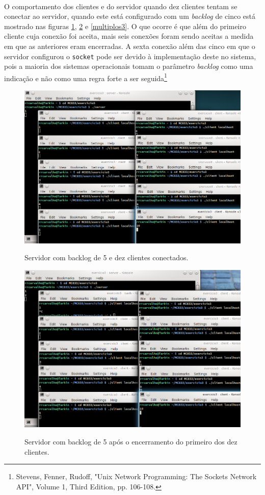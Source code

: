 \documentclass[a4paper,10pt,oneside,final,titlepage,onecolumn]{article}
\begin{document}
\paragraph{}O comportamento dos clientes e do servidor quando dez clientes tentam se conectar ao servidor, quando este está configurado com um \emph{backlog} de cinco está mostrado nas figuras \ref{multiplos1}, \ref{multiplos2} e \ref{multiplos3}. O que ocorre é que além do primeiro cliente cuja conexão foi aceita, mais seis conexões foram sendo aceitas a medida em que as anteriores eram encerradas. A sexta conexão além das cinco em que o servidor configurou o \verb|socket| pode ser devido à implementação deste no sistema, pois a maioria dos sistemas operacionais tomam o parâmetro \emph{backlog} como uma indicação e não como uma regra forte a ser seguida\footnote{Stevens, Fenner, Rudoff, "Unix Network Programming: The Sockets Network API", Volume 1, Third Edition, pp. 106-108.}
\begin{figure}[!ht]
  \caption{Servidor com backlog de 5 e dez clientes conectados.}
  \centering
  \includegraphics[width=117mm]{images/multiplos1.png}
  \label{multiplos1}
\end{figure}
\begin{figure}[!ht]
  \caption{Servidor com backlog de 5 após o encerramento do primeiro dos dez clientes.}
  \centering
  \includegraphics[width=117mm]{images/multiplos2.png}
  \label{multiplos2}
\end{figure}
\end{document}
